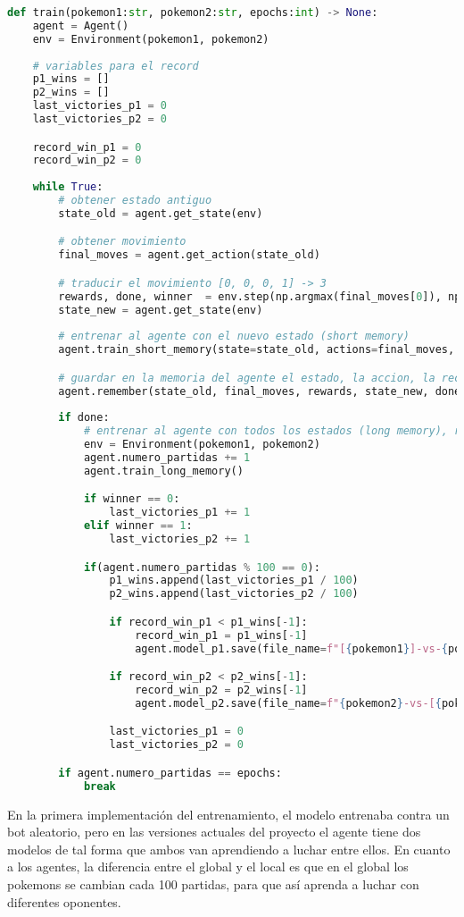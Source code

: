 \begin{lstlisting}[language=Python, caption=Entrenamiento de la IA]
    def train(pokemon1:str, pokemon2:str, epochs:int) -> None:
    agent = Agent()
    env = Environment(pokemon1, pokemon2)
    
    # variables para el record
    p1_wins = []
    p2_wins = []
    last_victories_p1 = 0
    last_victories_p2 = 0

    record_win_p1 = 0
    record_win_p2 = 0
    
    while True:
        # obtener estado antiguo
        state_old = agent.get_state(env)

        # obtener movimiento
        final_moves = agent.get_action(state_old)

        # traducir el movimiento [0, 0, 0, 1] -> 3
        rewards, done, winner  = env.step(np.argmax(final_moves[0]), np.argmax(final_moves[1]))
        state_new = agent.get_state(env)
                
        # entrenar al agente con el nuevo estado (short memory)
        agent.train_short_memory(state=state_old, actions=final_moves, rewards=rewards, next_state=state_new, done=done)

        # guardar en la memoria del agente el estado, la accion, la recompensa, el siguiente estado y si el juego ha terminado
        agent.remember(state_old, final_moves, rewards, state_new, done)
 
        if done:
            # entrenar al agente con todos los estados (long memory), resetear el juego y actualizar el record
            env = Environment(pokemon1, pokemon2)
            agent.numero_partidas += 1
            agent.train_long_memory()

            if winner == 0:
                last_victories_p1 += 1
            elif winner == 1:
                last_victories_p2 += 1

            if(agent.numero_partidas % 100 == 0):
                p1_wins.append(last_victories_p1 / 100)
                p2_wins.append(last_victories_p2 / 100)

                if record_win_p1 < p1_wins[-1]:
                    record_win_p1 = p1_wins[-1]
                    agent.model_p1.save(file_name=f"[{pokemon1}]-vs-{pokemon2}.pth")

                if record_win_p2 < p2_wins[-1]:
                    record_win_p2 = p2_wins[-1]
                    agent.model_p2.save(file_name=f"{pokemon2}-vs-[{pokemon1}].pth")

                last_victories_p1 = 0
                last_victories_p2 = 0

        if agent.numero_partidas == epochs:
            break 
\end{lstlisting}

En la primera implementación del entrenamiento, el modelo entrenaba contra un bot aleatorio, pero en las versiones actuales del proyecto el agente tiene dos modelos de tal forma que ambos van aprendiendo a luchar entre ellos. En cuanto a los agentes, la diferencia entre el global y el local es que en el global los pokemons se cambian cada 100 partidas, para que así aprenda a luchar con diferentes oponentes.



